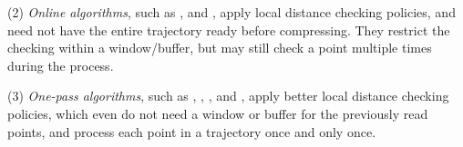 \sstab (2) {\em Online algorithms}, such as \opwa \cite{Meratnia:Spatiotemporal}, \squishe \cite{Muckell:Compression} and \bqsa \cite{Liu:BQS}, apply local distance checking policies, and need not have the entire trajectory ready before compressing. They restrict the checking within a window/buffer, but may still check a point  multiple times during the process.

\sstab (3) {\em One-pass algorithms}, such as \operb\cite{Lin:Operb}, \siped \cite{Williams:Longest,Sklansky:Cone,Dunham:Cone, Zhao:Sleeve}, \cised \cite{Lin:Cised}, \intersec\cite{Long:Direction} and \interval \cite{Ke:Interval}, apply better local distance checking policies, which even do not need a window or buffer for the previously read points, and process each point in a trajectory once and only once.




